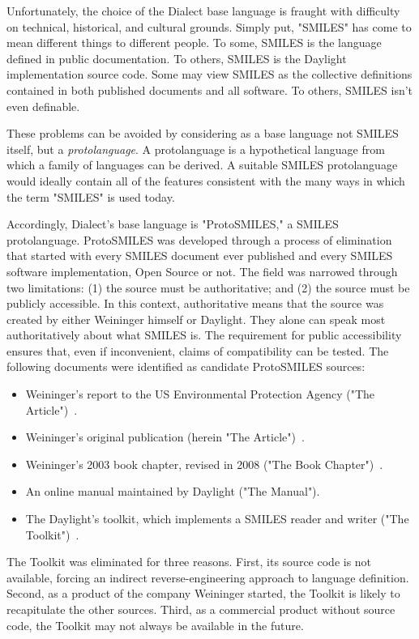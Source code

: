 \documentclass{article}
\begin{document}
Unfortunately, the choice of the Dialect base language is fraught with difficulty on technical, historical, and cultural grounds. Simply put, "SMILES" has come to mean different things to different people. To some, SMILES is the language defined in public documentation. To others, SMILES is the Daylight implementation source code. Some may view SMILES as the collective definitions contained in both published documents and all software. To others, SMILES isn't even definable.

These problems can be avoided by considering as a base language not SMILES itself, but a \textit{protolanguage}. A protolanguage is a hypothetical language from which a family of languages can be derived. A suitable SMILES protolanguage would ideally contain all of the features consistent with the many ways in which the term "SMILES" is used today.

Accordingly, Dialect's base language is "ProtoSMILES," a SMILES protolanguage. ProtoSMILES was developed through a process of elimination that started with every SMILES document ever published and every SMILES software implementation, Open Source or not. The field was narrowed through two limitations: (1) the source must be authoritative; and (2) the source must be publicly accessible. In this context, authoritative means that the source was created by either Weininger himself or Daylight. They alone can speak most authoritatively about what SMILES is. The requirement for public accessibility ensures that, even if inconvenient, claims of compatibility can be tested. The following documents were identified as candidate ProtoSMILES sources:

\begin{itemize}
    \item Weininger's report to the US Environmental Protection Agency ("The Article")~\cite{anderson:1987}.
    \item Weininger's original publication (herein "The Article")~\cite{weininger:1988}.
    \item Weininger's 2003 book chapter, revised in 2008 ("The Book Chapter")~\cite{weininger:2008}.
    \item An online manual maintained by Daylight ("The Manual").
    \item The Daylight's toolkit, which implements a SMILES reader and writer ("The Toolkit")~\cite{daylightToolkit}.
\end{itemize}

The Toolkit was eliminated for three reasons. First, its source code is not available, forcing an indirect reverse-engineering approach to language definition. Second, as a product of the company Weininger started, the Toolkit is likely to recapitulate the other sources. Third, as a commercial product without source code, the Toolkit may not always be available in the future.
\end{document}
